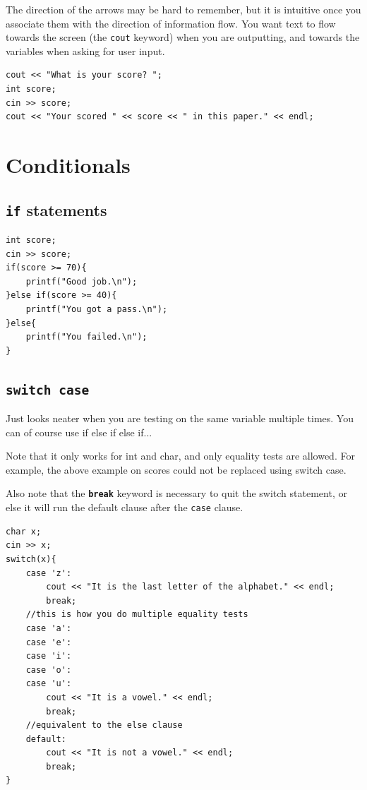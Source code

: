 The direction of the arrows may be hard to remember, but it is intuitive once you associate them with the direction of information flow. You want text to flow towards the screen (the \texttt{cout} keyword) when you are outputting, and towards the variables when asking for user input.

\begin{lstlisting}
cout << "What is your score? ";
int score;
cin >> score;
cout << "Your scored " << score << " in this paper." << endl;
\end{lstlisting}

\section{Conditionals}
\subsection{\texttt{if} statements}

\begin{lstlisting}
int score;
cin >> score;
if(score >= 70){
    printf("Good job.\n");
}else if(score >= 40){
    printf("You got a pass.\n");
}else{
    printf("You failed.\n");
}
\end{lstlisting}

\subsection{\texttt{switch case}}

Just looks neater when you are testing on the same variable multiple times. You can of course use if else if else if... 

Note that it only works for int and char, and only equality tests are allowed. For example, the above example on scores could not be replaced using switch case.

Also note that the \textbf{\texttt{break}} keyword is necessary to quit the switch statement, or else it will run the default clause after the \texttt{case} clause.

\begin{lstlisting}
char x;
cin >> x;
switch(x){
    case 'z':
        cout << "It is the last letter of the alphabet." << endl;
        break;
    //this is how you do multiple equality tests
    case 'a':
    case 'e':
    case 'i':
    case 'o':
    case 'u':
        cout << "It is a vowel." << endl;
        break;
    //equivalent to the else clause
    default:
        cout << "It is not a vowel." << endl;
        break;
}
\end{lstlisting}

